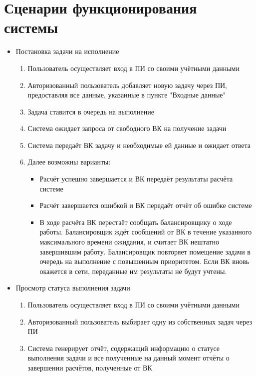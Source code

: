 \documentclass[a4paper,12pt]{report}
\numberwithin{equation}{section}
\begin{document}
\section{Сценарии функционирования системы}
\begin{itemize}
    \item Постановка задачи на исполнение
    \begin{enumerate}
        \item Пользователь осуществляет вход в ПИ со своими учётными данными
        \item Авторизованный пользователь добавляет новую задачу через ПИ, предоставляя все данные, указанные в пункте "Входные данные"
        \item Задача ставится в очередь на выполнение
        \item Система ожидает запроса от свободного ВК на получение задачи
        \item Система передаёт ВК задачу и необходимые ей данные и ожидает ответа
        \item Далее возможны варианты:
        \begin{itemize}
            \item Расчёт успешно завершается и ВК передаёт результаты расчёта системе
            \item Расчёт завершается ошибкой и ВК передаёт отчёт об ошибке системе
            \item В ходе расчёта ВК перестаёт сообщать балансировщику о ходе работы. Балансировщик ждёт сообщений от ВК в течение указанного максимального времени ожидания, и считает ВК нештатно завершившим работу. Балансировщик повторяет помещение задачи в очередь на выполнение с повышенным приоритетом. Если ВК вновь окажется в сети, переданные им результаты не будут учтены.
        \end{itemize}
    \end{enumerate}
    
    \item Просмотр статуса выполнения задачи
    \begin{enumerate}
        \item Пользователь осуществляет вход в ПИ со своими учётными данными
        \item Авторизованный пользователь выбирает одну из собственных задач через ПИ
        \item Система генерирует отчёт, содержащий информацию о статусе выполнения задачи и все полученные на данный момент отчёты о завершении расчётов, полученные от ВК
    \end{enumerate}
    

\end{itemize}
\end{document}
